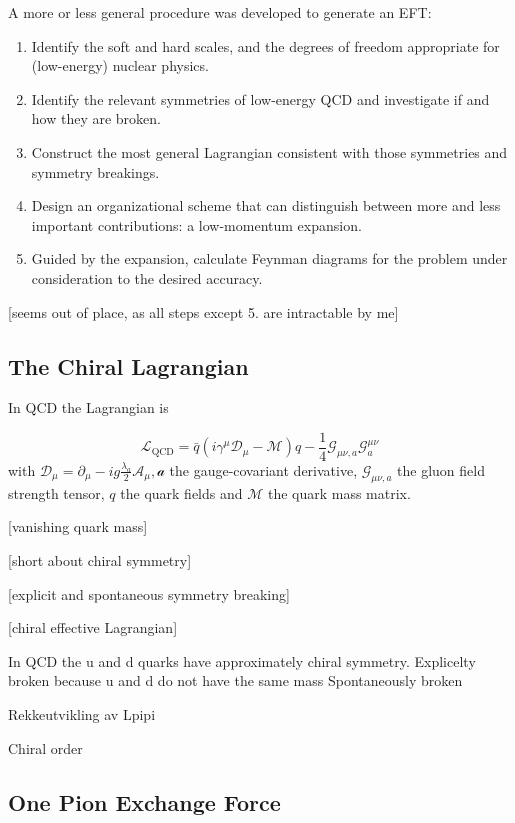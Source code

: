 A more or less general procedure was developed to generate an EFT\cite[p.~7]{Machleidt_2011}:
\begin{enumerate}
\item  Identify the soft and hard scales, and the degrees of freedom appropriate
  for (low-energy) nuclear physics.
\item Identify the relevant symmetries of low-energy QCD and investigate if and how they are broken.
\item Construct the most general Lagrangian consistent with those symmetries and symmetry breakings.
\item Design an organizational scheme that can distinguish between more and less important contributions:
  a low-momentum expansion.
\item Guided by the expansion, calculate Feynman diagrams for the problem under consideration to the
  desired accuracy.
\end{enumerate}
[seems out of place, as all steps except 5. are intractable by me]

\subsection{The Chiral Lagrangian}

In QCD the Lagrangian is\cite[p.~7]{Machleidt_2011}

\begin{equation*}
  \mathcal{L}_{\text{QCD}} = \bar{q}(i\gamma^{\mu}\mathcal{D}_{\mu} - \mathcal{M})q
  - \frac{1}{4}\mathcal{G}_{\mu\nu,a}\mathcal{G}^{\mu\nu}_{a}
\end{equation*}
with \(\mathcal{D}_{\mu} = \partial_{\mu} - i
g\frac{\lambda_{a}}{2}\mathcal{A_{\mu},a}\) the gauge-covariant derivative,
\(\mathcal{G}_{\mu\nu,a}\) the gluon field strength tensor, \(q\) the quark
fields and \(\mathcal{M}\) the quark mass matrix.

[vanishing quark mass]

[short about chiral symmetry]

[explicit and spontaneous symmetry breaking]

[chiral effective Lagrangian]


In QCD the u  and d quarks have approximately chiral symmetry.
Explicelty broken because u and d do not have the same mass
Spontaneously broken

Rekkeutvikling av Lpipi

Chiral order

\subsection{One Pion Exchange Force}

